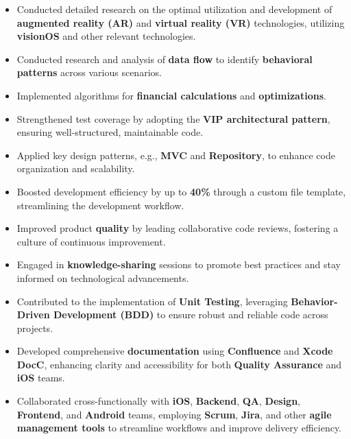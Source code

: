 \documentclass[letter,10pt]{article}
\newcommand{\customsquare}{\raisebox{0.25ex}{\scalebox{0.45}{$\blacksquare$}}}
\begin{document}
\begin{itemize}[label={\customsquare}]
    \item Conducted detailed research on the optimal utilization and development of \textbf{augmented reality (AR)} and \textbf{virtual reality (VR)} technologies, utilizing \textbf{visionOS} and other relevant technologies.
    \item Conducted research and analysis of \textbf{data flow} to identify \textbf{behavioral patterns} across various scenarios.
    \item Implemented algorithms for \textbf{financial calculations} and \textbf{optimizations}.
    \item Strengthened test coverage by adopting the \textbf{VIP architectural pattern}, ensuring well-structured, maintainable code.
    \item Applied key design patterns, e.g., \textbf{MVC} and \textbf{Repository}, to enhance code organization and scalability.
    \item Boosted development efficiency by up to \textbf{40\%} through a custom file template, streamlining the development workflow.
    \item Improved product \textbf{quality} by leading collaborative code reviews, fostering a culture of continuous improvement.
    \item Engaged in \textbf{knowledge-sharing} sessions to promote best practices and stay informed on technological advancements.
    \item Contributed to the implementation of \textbf{Unit Testing}, leveraging \textbf{Behavior-Driven Development (BDD)} to ensure robust and reliable code across projects.
    \item Developed comprehensive \textbf{documentation} using \textbf{Confluence} and \textbf{Xcode DocC}, enhancing clarity and accessibility for both \textbf{Quality Assurance} and \textbf{iOS} teams.
    \item Collaborated cross-functionally with \textbf{iOS}, \textbf{Backend}, \textbf{QA}, \textbf{Design}, \textbf{Frontend}, and \textbf{Android} teams, employing \textbf{Scrum}, \textbf{Jira}, and other \textbf{agile management tools} to streamline workflows and improve delivery efficiency.
\end{itemize}

\end{document}
